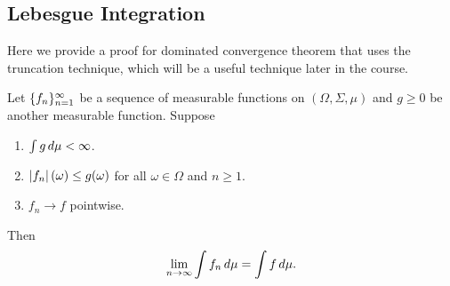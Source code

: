 \documentclass[a4paper]{article}
\begin{document}
\subsection{Lebesgue Integration}

Here we provide a proof for dominated convergence theorem that uses
the truncation technique, which will be a useful technique later
in the course.

\begin{thm}
  Let $\{ f_n \}_{n=1}^\infty$ be a sequence of measurable
  functions on $(\Omega, \Sigma, \mu)$ and $g \geq 0$ be another measurable
  function. Suppose
  \begin{enumerate}
    \item $\int g \, d \mu < \infty$.
    \item $\left\lvert f_n\right\rvert (\omega) \leq g (\omega)$ for all $\omega \in \Omega$
    and $n \geq 1$.
    \item $f_n \to f$ pointwise.
  \end{enumerate}
  Then
  \[
  \lim_{n \to \infty} \int f_n \, d \mu = \int f \, d \mu.
  \]
\end{thm}
\end{document}
